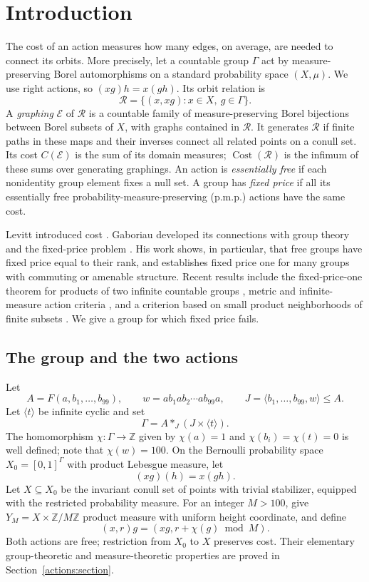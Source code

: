 \section{Introduction}

The cost of an action measures how many edges, on average, are needed
to connect its orbits. More precisely, let a countable group $\Gamma$
act by measure-preserving Borel automorphisms on a standard probability
space $(X,\mu)$. We use right actions, so $(xg)h=x(gh)$.
Its orbit relation is
\[
 \mathcal R=\{(x,xg):x\in X,\ g\in\Gamma\}.
\]
A \emph{graphing} $\mathcal E$ of $\mathcal R$ is a countable family of
measure-preserving Borel bijections between Borel subsets of $X$,
with graphs contained in $\mathcal R$. It generates $\mathcal R$ if
finite paths in these maps and their inverses connect all related
points on a conull set. Its cost $C(\mathcal E)$ is the sum of its domain measures;
$\operatorname{Cost}(\mathcal R)$ is the infimum of these sums over
generating graphings. An action is \emph{essentially free} if each
nonidentity group element fixes a null set. A group has \emph{fixed
price} if all its essentially free probability-measure-preserving
(p.m.p.) actions have the same cost.

Levitt introduced cost \cite{levitt-1995}. Gaboriau developed its
connections with group theory and the fixed-price problem
\cite{gaboriau-2000}. His work shows, in particular, that free groups
have fixed price equal to their rank, and establishes fixed price one
for many groups with commuting or amenable structure. Recent results
include the fixed-price-one theorem for products of two infinite
countable groups \cite{khezeli-2026-v4}, metric and infinite-measure
action criteria \cite{bevilacqua-bowen-2025-v1}, and a criterion based
on small product neighborhoods of finite subsets
\cite{slutsky-2026-v1}. We give a group for which fixed price fails.

\subsection{The group and the two actions}

Let
\[
 A=F(a,b_1,\ldots,b_{99}),\qquad
 w=ab_1ab_2\cdots ab_{99}a,
 \qquad J=\langle b_1,\ldots,b_{99},w\rangle\le A.
\]
Let $\langle t\rangle$ be infinite cyclic and set
\begin{equation}\label{intro:group}
 \Gamma=A*_J(J\times\langle t\rangle).
\end{equation}
The homomorphism $\chi:\Gamma\to\mathbb Z$ given by
$\chi(a)=1$ and $\chi(b_i)=\chi(t)=0$ is well defined; note that
$\chi(w)=100$. On the Bernoulli
probability space $X_0=[0,1]^\Gamma$ with product Lebesgue measure, let
\[
 (xg)(h)=x(gh).
\]
Let $X\subseteq X_0$ be the invariant conull set of points with trivial
stabilizer, equipped with the restricted probability measure. For an
integer $M>100$, give $Y_M=X\times\mathbb Z/M\mathbb Z$
product measure with uniform height coordinate, and define
\[
 (x,r)g=(xg,r+\chi(g)\bmod M).
\]
Both actions are free; restriction from $X_0$ to $X$ preserves cost.
Their elementary group-theoretic
and measure-theoretic properties are proved in Section~\ref{actions:section}.

